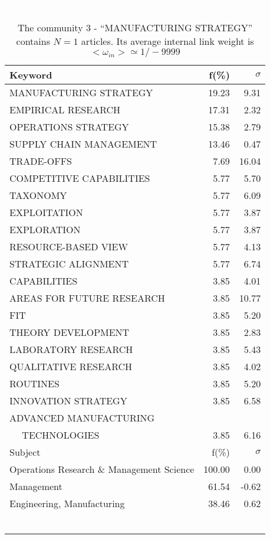 \documentclass[a4paper,11pt]{report}
\begin{document}
\begin{landscape}
\begin{table}[!ht]
\caption{The community 3 - ``MANUFACTURING STRATEGY'' contains $N = 1$ articles. Its average internal link weight is $<\omega_{in}> \simeq 1/-9999$ }
\textcolor{white}{aa}\\
{\scriptsize\begin{tabular}{|l r r|}
\hline
Keyword & f(\%) & $\sigma$\\
\hline
MANUFACTURING STRATEGY & 19.23 & 9.31\\
EMPIRICAL RESEARCH & 17.31 & 2.32\\
OPERATIONS STRATEGY & 15.38 & 2.79\\
SUPPLY CHAIN MANAGEMENT & 13.46 & 0.47\\
TRADE-OFFS & 7.69 & 16.04\\
COMPETITIVE CAPABILITIES & 5.77 & 5.70\\
TAXONOMY & 5.77 & 6.09\\
EXPLOITATION & 5.77 & 3.87\\
EXPLORATION & 5.77 & 3.87\\
RESOURCE-BASED VIEW & 5.77 & 4.13\\
STRATEGIC ALIGNMENT & 5.77 & 6.74\\
CAPABILITIES & 3.85 & 4.01\\
AREAS FOR FUTURE RESEARCH & 3.85 & 10.77\\
FIT & 3.85 & 5.20\\
THEORY DEVELOPMENT & 3.85 & 2.83\\
LABORATORY RESEARCH & 3.85 & 5.43\\
QUALITATIVE RESEARCH & 3.85 & 4.02\\
ROUTINES & 3.85 & 5.20\\
INNOVATION STRATEGY & 3.85 & 6.58\\
ADVANCED MANUFACTURING &  & \\
$\quad$ TECHNOLOGIES & 3.85 & 6.16\\
\hline
\hline
Subject & f(\%) & $\sigma$\\
\hline
Operations Research \& Management Science & 100.00 & 0.00\\
Management & 61.54 & -0.62\\
Engineering, Manufacturing & 38.46 & 0.62\\
 &  & \\
 &  & \\
 &  & \\
 &  & \\
 &  & \\
 &  & \\

\end{tabular}}
\end{table}
\end{landscape}
\end{document}

